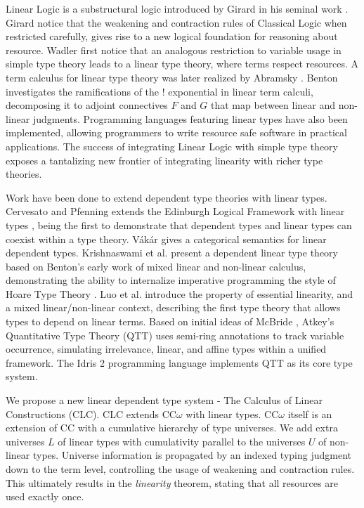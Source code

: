 \documentclass{article}
\begin{document}
  Linear Logic is a substructural logic introduced by Girard in his seminal work \cite{girard}. Girard notice that the weakening and contraction rules of Classical Logic when restricted carefully, gives rise to a new logical foundation for reasoning about resource. Wadler \cite{wadler1990,wadler1991} first notice that an analogous restriction to variable usage in simple type theory leads to a linear type theory, where terms respect resources. A term calculus for linear type theory was later realized by Abramsky \cite{abramsky1993}. Benton \cite{benton1994} investigates the ramifications of the ! exponential in linear term calculi, decomposing it to adjoint connectives $F$ and $G$ that map between linear and non-linear judgments. Programming languages \cite{l3,ats,linear-haskell} featuring linear types have also been implemented, allowing programmers to write resource safe software in practical applications. The success of integrating Linear Logic with simple type theory exposes a tantalizing new frontier of integrating linearity with richer type theories.

  Work have been done to extend dependent type theories with linear types. Cervesato and Pfenning extends the Edinburgh Logical Framework with linear types \cite{lf,llf}, being the first to demonstrate that dependent types and linear types can coexist within a type theory. V\'{a}k\'{a}r \cite{vakar14} gives a categorical semantics for linear dependent types.  Krishnaswami et al. present a dependent linear type theory \cite{neel15} based on Benton's early work of mixed linear and non-linear calculus, demonstrating the ability to internalize imperative programming the style of Hoare Type Theory \cite{htt}. Luo et al. introduce the property of essential linearity, and a mixed linear/non-linear context, describing the first type theory that allows types to depend on linear terms. Based on initial ideas of McBride \cite{nothing}, Atkey's Quantitative Type Theory (QTT) \cite{qtt} uses semi-ring annotations to track variable occurrence, simulating irrelevance, linear, and affine types within a unified framework. The Idris 2 programming language \cite{idris2} implements QTT as its core type system.

  We propose a new linear dependent type system - The Calculus of Linear Constructions (CLC). CLC extends CC$\omega$ with linear types. CC$\omega$ itself is an extension of CC with a cumulative hierarchy of type universes. We add extra universes $L$ of linear types with cumulativity parallel to the universes $U$ of non-linear types. Universe information is propagated by an indexed typing judgment down to the term level, controlling the usage of weakening and contraction rules. This ultimately results in the \textit{linearity} theorem, stating that all resources are used exactly once.
\end{document}

